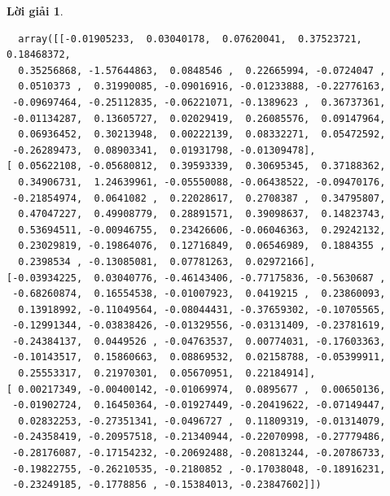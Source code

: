 \documentclass[14pt, a4paper]{article}
\theoremstyle{sltheorem}
\theoremstyle{soltheorem}
\newtheorem*{loigiai}{Lời giải}
\begin{document}
\begin{loigiai}
    \begin{verbatim}
  array([[-0.01905233,  0.03040178,  0.07620041,  0.37523721,  0.18468372,
  0.35256868, -1.57644863,  0.0848546 ,  0.22665994, -0.0724047 ,
  0.0510373 ,  0.31990085, -0.09016916, -0.01233888, -0.22776163,
 -0.09697464, -0.25112835, -0.06221071, -0.1389623 ,  0.36737361,
 -0.01134287,  0.13605727,  0.02029419,  0.26085576,  0.09147964,
  0.06936452,  0.30213948,  0.00222139,  0.08332271,  0.05472592,
 -0.26289473,  0.08903341,  0.01931798, -0.01309478],
[ 0.05622108, -0.05680812,  0.39593339,  0.30695345,  0.37188362,
  0.34906731,  1.24639961, -0.05550088, -0.06438522, -0.09470176,
 -0.21854974,  0.0641082 ,  0.22028617,  0.2708387 ,  0.34795807,
  0.47047227,  0.49908779,  0.28891571,  0.39098637,  0.14823743,
  0.53694511, -0.00946755,  0.23426606, -0.06046363,  0.29242132,
  0.23029819, -0.19864076,  0.12716849,  0.06546989,  0.1884355 ,
  0.2398534 , -0.13085081,  0.07781263,  0.02972166],
[-0.03934225,  0.03040776, -0.46143406, -0.77175836, -0.5630687 ,
 -0.68260874,  0.16554538, -0.01007923,  0.0419215 ,  0.23860093,
  0.13918992, -0.11049564, -0.08044431, -0.37659302, -0.10705565,
 -0.12991344, -0.03838426, -0.01329556, -0.03131409, -0.23781619,
 -0.24384137,  0.0449526 , -0.04763537,  0.00774031, -0.17603363,
 -0.10143517,  0.15860663,  0.08869532,  0.02158788, -0.05399911,
  0.25553317,  0.21970301,  0.05670951,  0.22184914],
[ 0.00217349, -0.00400142, -0.01069974,  0.0895677 ,  0.00650136,
 -0.01902724,  0.16450364, -0.01927449, -0.20419622, -0.07149447,
  0.02832253, -0.27351341, -0.0496727 ,  0.11809319, -0.01314079,
 -0.24358419, -0.20957518, -0.21340944, -0.22070998, -0.27779486,
 -0.28176087, -0.17154232, -0.20692488, -0.20813244, -0.20786733,
 -0.19822755, -0.26210535, -0.2180852 , -0.17038048, -0.18916231,
 -0.23249185, -0.1778856 , -0.15384013, -0.23847602]])
    \end{verbatim}


\end{loigiai}
\end{document}
